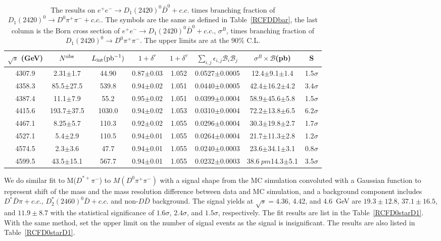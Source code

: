 \documentclass[aps,preprint,superscriptaddress,12pt,tightenlines]{revtex4}
\newcommand{\pp}{\pi^+\pi^-}
\begin{document}
\begin{table}[!htbp]
\caption{The results on $e^{+}e^{-}\to
D_{1}(2420)^{0}\bar{D}^{0}+c.c.$ times branching fraction of $D_{1}(2420)^{0}\rightarrow D^{0}\pi^{+}\pi^{-}+c.c.$. The symbols are the same as
defined in Table~\ref{RCFDDbar}, the last column is the Born cross
section of $e^{+}e^{-}\to D_{1}(2420)^{0}\bar{D}^{0}+c.c.$,
$\sigma^{B}$, times branching fraction of $D_{1}(2420)^{0}\to
D^{0}\pi^{+}\pi^{-}$. The upper limits are at the 90\% C.L. }
\label{RCFD0D1}
\begin{tabular}{c c c c c c c c}
\hline \hline
    $\sqrt{s}$ (GeV)      &$N^{\rm obs}$  &$L_{\rm int}({\rm pb}^{-1})$  &$1+\delta^{r}$  &$1+\delta^{v}$  &$\sum_{i,j}\epsilon_{i,j} \mathcal{B}_{i}\mathcal{B}_{j}$     &$\sigma^{B}\times\mathcal{B}$(pb) &S \\
    \hline
     4307.9&      2.31$\pm$1.7    &44.90  &0.87$\pm$0.03 &1.052  &0.0527$\pm$0.0005   &12.4$\pm$9.1$\pm$1.4   &1.5$\sigma$ \\
     4358.3&      85.5$\pm$27.5   &539.8  &0.94$\pm$0.02 &1.051  &0.0440$\pm$0.0005   &42.4$\pm$16.2$\pm$4.2  &3.4$\sigma$ \\
     4387.4&      11.1$\pm$7.9    &55.2   &0.95$\pm$0.02 &1.051  &0.0399$\pm$0.0004   &58.9$\pm$45.6$\pm$5.8  &1.5$\sigma$ \\
     4415.6&      193.7$\pm$37.5  &1030.0 &0.94$\pm$0.02 &1.053  &0.0310$\pm$0.0004   &72.2$\pm$13.8$\pm$6.5  &6.2$\sigma$ \\
     4467.1&      8.25$\pm$5.7     &110.3  &0.92$\pm$0.02 &1.055  &0.0296$\pm$0.0004  &30.3$\pm$19.8$\pm$2.7  &1.7$\sigma$ \\
     4527.1&      5.4$\pm$2.9     &110.5  &0.94$\pm$0.01 &1.055  &0.0264$\pm$0.0004   &21.7$\pm$11.3$\pm$2.8  &1.2$\sigma$ \\
     4574.5&      2.3$\pm$3.6     &47.7   &0.94$\pm$0.01 &1.055  &0.0240$\pm$0.0003   &23.6$\pm$34.1$\pm$3.1  &0.8$\sigma$ \\
     4599.5&      43.5$\pm$15.1   &567.7  &0.94$\pm$0.01 &1.055  &0.0232$\pm$0.0003   &38.6$\ pm$14.3$\pm$5.1  &3.5$\sigma$ \\
    \hline \hline
\end{tabular}
\end{table}




We do similar fit to M($D^{*+}\pi^{-}$)  to $M(D^0\pp)$ with a
 signal shape from the MC simulation convoluted with
a Gaussian function to represent shift of the mass and the mass
resolution difference between data and MC simulation, and a
background component includes
$D^{*}\bar{D}\pi+c.c.$, $D_{2}^{*}(2460)^{0}\bar{D}+c.c.$ and
non-$D\bar{D}$ background. The signal yields at $\sqrt{s} = 4.36$, 4.42, and 4.6~GeV
are $19.3\pm 12.8$, $37.1\pm 16.5$, and $11.9\pm 8.7$ with the
statistical significance of $1.6\sigma$, $2.4\sigma$, and
$1.5\sigma$, respectively. The fit results are list in the Table~\ref{RCFD0starD1}.  With the
same method, set the upper limit on the number of signal events as
the signal is insignificant. The results are also listed in
Table~\ref{RCFD0starD1}.
\end{document}
